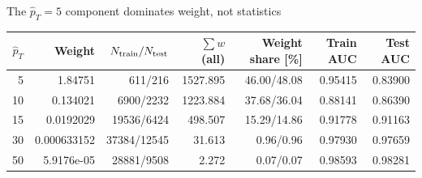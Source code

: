 \begin{frame}[label=p5_20260920]{The $\hat p_T=5$ component dominates weight, not statistics}

\begin{center}\small
\begin{tabular}{@{}rrrrrrr@{}}\toprule
$\hat p_T$ & Weight & $N_{\rm train}/N_{\rm test}$ & $\sum w$ (all) & Weight share [\%] & Train AUC & Test AUC\\\midrule
5 & 1.84751 & 611/216 & 1527.895 & 46.00/48.08 & 0.95415 & 0.83900\\
10 & 0.134021 & 6900/2232 & 1223.884 & 37.68/36.04 & 0.88141 & 0.86390\\
15 & 0.0192029 & 19536/6424 & 498.507 & 15.29/14.86 & 0.91778 & 0.91163\\
30 & 0.000633152 & 37384/12545 & 31.613 & 0.96/0.96 & 0.97930 & 0.97659\\
50 & 5.9176e-05 & 28881/9508 & 2.272 & 0.07/0.07 & 0.98593 & 0.98281\\
\bottomrule\end{tabular}\end{center}
\par\vspace{0.2em}
\par\vspace{0.2em}
\par\vspace{0.2em}

\end{frame}

